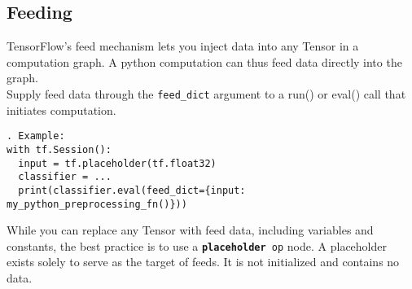\documentclass[11pt,a4paper]{article}
\begin{document}
\subsection{Feeding}
TensorFlow's feed mechanism lets you inject data into any Tensor in a computation graph. A python computation can thus feed data directly into the graph.\\
Supply feed data through the \texttt{feed\_dict} argument to a run() or eval() call that initiates computation.
\begin{lstlisting}. Example: 
with tf.Session():
  input = tf.placeholder(tf.float32)
  classifier = ...
  print(classifier.eval(feed_dict={input: my_python_preprocessing_fn()}))
  \end{lstlisting}

While you can replace any Tensor with feed data, including variables and constants, the best practice is to use a \texttt{\textbf{placeholder} op}  node. A placeholder exists solely to serve as the target of feeds. It is not initialized and contains no data.
\end{document}
